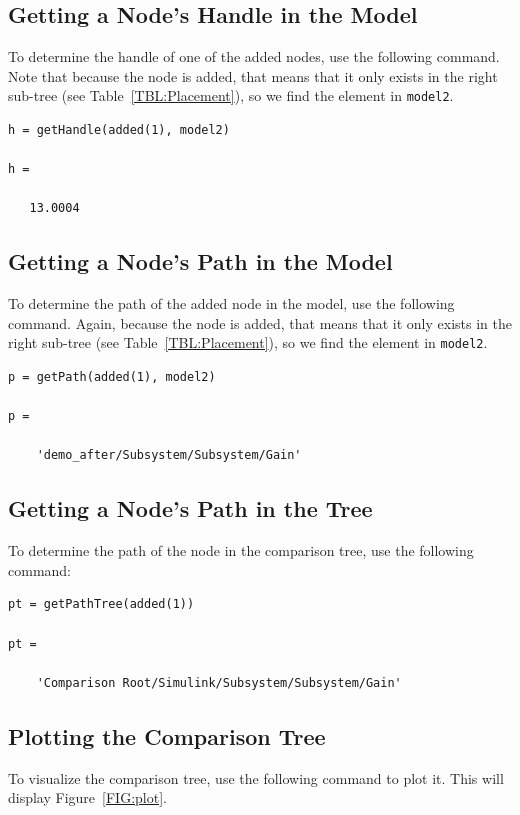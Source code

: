 \documentclass{article}
\begin{document}
\subsection{Getting a Node's Handle in the Model}
To determine the handle of one of the added nodes, use the following command. Note that because the node is added, that means that it only exists in the right sub-tree (see Table~\ref{TBL:Placement}), so we find the element in \texttt{model2}.

\begin{lstlisting}
h = getHandle(added(1), model2)

h =

   13.0004
\end{lstlisting}

\subsection{Getting a Node's Path in the Model}
To determine the path of the added node in the model, use the following command. Again, because the node is added, that means that it only exists in the right sub-tree (see Table~\ref{TBL:Placement}), so we find the element in \texttt{model2}.

\begin{lstlisting}
p = getPath(added(1), model2)

p =

    'demo_after/Subsystem/Subsystem/Gain'
\end{lstlisting}

\subsection{Getting a Node's Path in the Tree}
To determine the path of the node in the comparison tree, use the following command:

\begin{lstlisting}
pt = getPathTree(added(1))

pt =

    'Comparison Root/Simulink/Subsystem/Subsystem/Gain'
\end{lstlisting}

\subsection{Plotting the Comparison Tree}
To visualize the comparison tree, use the following command to plot it. This will display Figure~\ref{FIG:plot}.
\end{document}
